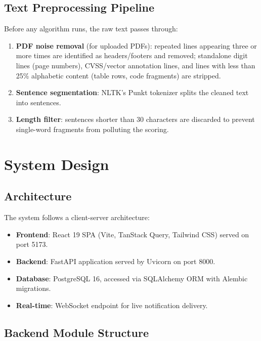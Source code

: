 \documentclass[12pt,a4paper]{article}
\begin{document}
\subsection{Text Preprocessing Pipeline}

Before any algorithm runs, the raw text passes through:

\begin{enumerate}[noitemsep]
  \item \textbf{PDF noise removal} (for uploaded PDFs): repeated lines appearing three or more times are identified as headers/footers and removed; standalone digit lines (page numbers), CVSS/vector annotation lines, and lines with less than 25\% alphabetic content (table rows, code fragments) are stripped.
  \item \textbf{Sentence segmentation}: NLTK's Punkt tokenizer splits the cleaned text into sentences.
  \item \textbf{Length filter}: sentences shorter than 30 characters are discarded to prevent single-word fragments from polluting the scoring.
\end{enumerate}

\section{System Design}

\subsection{Architecture}

The system follows a client-server architecture:

\begin{itemize}[noitemsep]
  \item \textbf{Frontend}: React 19 SPA (Vite, TanStack Query, Tailwind CSS) served on port 5173.
  \item \textbf{Backend}: FastAPI application served by Uvicorn on port 8000.
  \item \textbf{Database}: PostgreSQL 16, accessed via SQLAlchemy ORM with Alembic migrations.
  \item \textbf{Real-time}: WebSocket endpoint for live notification delivery.
\end{itemize}

\subsection{Backend Module Structure}
\end{document}
